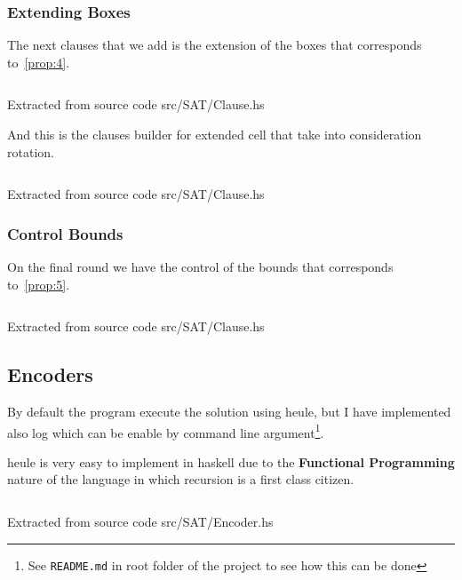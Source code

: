 \documentclass[12pt, a4paper]{article}
\begin{document}
\subsubsection{Extending Boxes}

The next clauses that we add is the extension of the boxes that corresponds to~\ref{prop:4}.

\begin{listing}[H]
  \inputminted[firstline=56, lastline=83, linenos, breaklines]{haskell}{../src/SAT/Clause.hs}
  \caption{Extracted from source code src/SAT/Clause.hs}
  \label{src:sat:cl:3}
\end{listing}

And this is the clauses builder for extended cell that take into consideration rotation.

\begin{listing}[H]
  \inputminted[firstline=86, lastline=107, linenos, breaklines]{haskell}{../src/SAT/Clause.hs}
  \caption{Extracted from source code src/SAT/Clause.hs}
  \label{src:sat:cl:4}
\end{listing}

\subsubsection{Control Bounds}

On the final round we have the control of the bounds that corresponds to~\ref{prop:5}.

\begin{listing}[H]
  \inputminted[firstline=110, lastline=130, linenos, breaklines]{haskell}{../src/SAT/Clause.hs}
  \caption{Extracted from source code src/SAT/Clause.hs}
  \label{src:sat:cl:5}
\end{listing}



\subsection{Encoders}
By default the program execute the solution using \acrfull{heule}, but I have implemented also \acrfull{log} which can be enable by command line argument\footnote{See \texttt{README.md} in root folder of the project to see how this can be done}.

\acrlong{heule} is very easy to implement in \acrshort{haskell} due to the \textbf{Functional Programming} nature of the language in which recursion is a first class citizen.

\begin{listing}[H]
  \inputminted[firstline=54, lastline=73, linenos, breaklines]{haskell}{../src/SAT/Encoder.hs}
  \caption{Extracted from source code src/SAT/Encoder.hs}
  \label{src:sat:2}
\end{listing}
\end{document}
